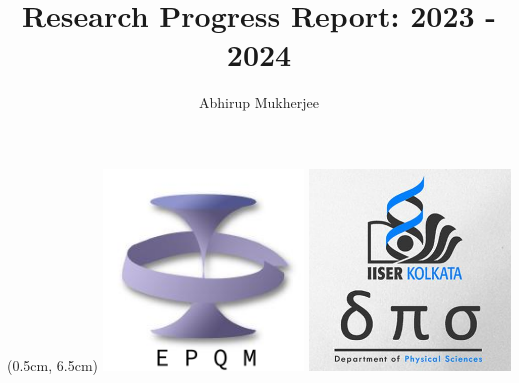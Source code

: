 \documentclass[11pt,aspectratio=169]{beamer}
\title{Research Progress Report: 2023 - 2024}
\author{Abhirup Mukherjee}
\institute{
Department of Physical Sciences, IISER Kolkata, Mohanpur}
\begin{document}
\centering

\begin{frame}
\maketitle

\begin{textblock*}{0.3\textwidth}(0.5cm, 6.5cm)
	\includegraphics[width=0.4\textwidth]{epqm_logo_mod.jpeg}
	\hspace*{\fill}
	\includegraphics[width=0.4\textwidth]{dps_logo.jpeg}
\end{textblock*}
\hspace*{\fill}
\end{frame}
\end{document}
